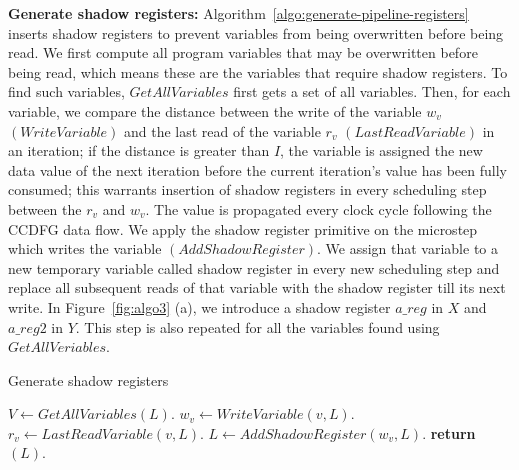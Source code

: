 {\bf Generate shadow registers:} Algorithm~\ref{algo:generate-pipeline-registers} inserts shadow registers
to prevent variables from being overwritten before being read. We first compute all program variables that may be
overwritten before being read, which means these are the variables that require shadow registers. To find such variables,
 $GetAllVariables$ first gets a set of all variables. Then, for each variable, we compare the distance between the write of
  the variable $w_v$ $(WriteVariable)$ and the last read of the variable $r_v$ $(LastReadVariable)$ in an iteration; if the
   distance is greater than $I$, the variable is assigned the new data value of the next iteration before the current iteration's value
    has been fully consumed; this warrants insertion of shadow registers in every scheduling step between the $r_v$ and $w_v$. The value is propagated every clock cycle following the CCDFG data flow.
We apply the shadow register primitive on the microstep which writes the variable $(AddShadowRegister)$. We assign that
 variable to a new temporary variable called shadow register in every new scheduling step and replace all subsequent reads of that variable with the shadow register till its next write. In Figure~\ref{fig:algo3} (a), we introduce a shadow register $a\_reg$ in $X$ and $a\_reg2$ in $Y$. This step is also repeated for all the variables found using $GetAllVeriables$.

\begin{algorithm}[H]
\caption{Generate shadow registers} 
\label{algo:generate-pipeline-registers}
\begin{algorithmic}[1]
\State $V \leftarrow GetAllVariables(L)$.
\State $w_v \leftarrow WriteVariable (v, L)$.
\State $r_v \leftarrow LastReadVariable (v, L)$.
\State $L \leftarrow AddShadowRegister (w_v, L)$.
\EndIf
\EndFor
\State \textbf{return} $(L)$.
\EndProcedure
\end{algorithmic}
\end{algorithm}

